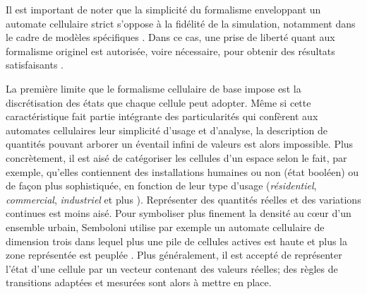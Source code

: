 \documentclass[12pt]{article}
\begin{document}
Il est important de noter que la simplicité du formalisme enveloppant
un automate cellulaire strict s'oppose à la fidélité de la simulation,
notamment dans le cadre de modèles spécifiques
\cite{Torrens2001}. Dans ce cas, une prise de liberté quant aux
formalisme originel est autorisée, voire nécessaire, pour obtenir des
résultats satisfaisants \cite{White1998}.

La première limite que le formalisme cellulaire de base impose est la
discrétisation des états que chaque cellule peut adopter. Même si
cette caractéristique fait partie intégrante des particularités qui
confèrent aux automates cellulaires leur simplicité d'usage et
d'analyse, la description de quantités pouvant arborer un éventail
infini de valeurs est alors impossible. Plus concrètement, il est aisé
de catégoriser les cellules d'un espace selon le fait, par exemple,
qu'elles contiennent des installations humaines ou non (état booléen)
\cite{Benguigui2004,Cornu2008} ou de façon plus sophistiquée, en
fonction de leur type d'usage (\textit{résidentiel},
\textit{commercial}, \textit{industriel} \cite{Lechner} et plus
\cite{Dubos-Paillard2003}). Représenter des quantités réelles et des
variations continues est moins aisé. Pour symboliser plus finement la
densité au c\oe ur d'un ensemble urbain, Semboloni utilise par exemple
un automate cellulaire de dimension trois dans lequel plus une pile de
cellules actives est haute et plus la zone représentée est peuplée
\cite{Semboloni2000}. Plus généralement, il est accepté de représenter
l'état d'une cellule par un vecteur contenant des valeurs réelles; des
règles de transitions adaptées et mesurées sont alors à mettre en
place.
\end{document}
